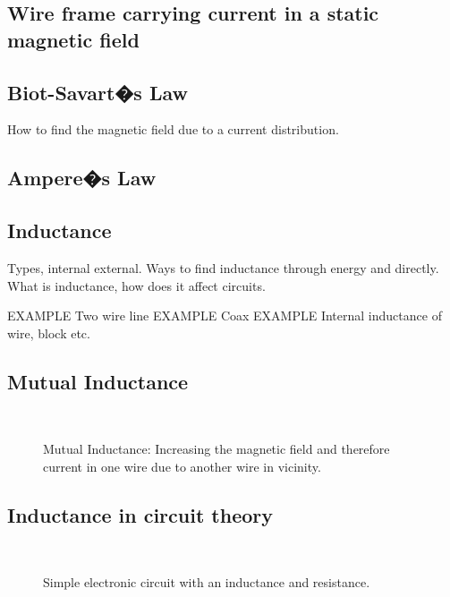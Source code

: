 \subsection{Wire frame carrying current in a static magnetic field}


\subsection{Biot-Savart�s Law}
How to find the magnetic field due to a current distribution.





\subsection{Ampere�s Law}


\subsection{Inductance}
Types, internal external.  Ways to find inductance through energy and directly. What is inductance, how does it affect circuits.

{\large EXAMPLE} Two wire line
{\large EXAMPLE} Coax
{\large EXAMPLE} Internal inductance of wire, block etc.

\subsection{Mutual Inductance}



\begin{figure}[htbp]
\begin{center}
\strut{} \\
\end{center}
\caption{Mutual Inductance: Increasing the magnetic field and therefore current in one wire due to another wire in vicinity. }
\label{wind}
\end{figure}


\subsection{Inductance in circuit theory}

\begin{figure}[htbp]
\begin{center}
\strut{} \\
\end{center}
\caption{Simple electronic circuit with an inductance and resistance.}
\label{wind}
\end{figure}





